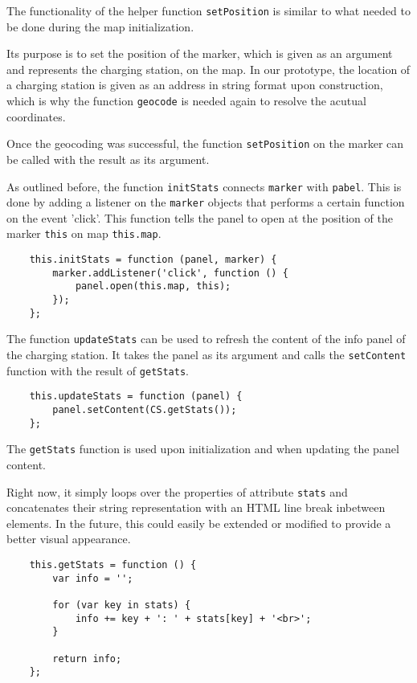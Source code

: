 The functionality of the helper function \texttt{setPosition} is similar to what needed to be done during the map initialization.

Its purpose is to set the position of the marker, which is given as an argument and represents the charging station, on the map. In our prototype, the location of a charging station is given as an address in string format upon construction, which is why the function \texttt{geocode} is needed again to resolve the acutual coordinates.

Once the geocoding was successful, the function \texttt{setPosition} on the marker can be called with the result as its argument.

As outlined before, the function \texttt{initStats} connects \texttt{marker} with \texttt{pabel}. This is done by adding a listener on the \texttt{marker} objects that performs a certain function on the event 'click'. This function tells the panel to open at the position of the marker \texttt{this} on map \texttt{this.map}.

\begin{verbatim}
    this.initStats = function (panel, marker) {
        marker.addListener('click', function () {
            panel.open(this.map, this);
        });
    };
\end{verbatim}

The function \texttt{updateStats} can be used to refresh the content of the info panel of the charging station. It takes the panel as its argument and calls the \texttt{setContent} function with the result of \texttt{getStats}.

\begin{verbatim}
    this.updateStats = function (panel) {
        panel.setContent(CS.getStats());
    };
\end{verbatim}

The \texttt{getStats} function is used upon initialization and when updating the panel content.

Right now, it simply loops over the properties of attribute \texttt{stats} and concatenates their string representation with an HTML line break inbetween elements. In the future, this could easily be extended or modified to provide a better visual appearance.

\begin{verbatim}
    this.getStats = function () {
        var info = '';

        for (var key in stats) {
            info += key + ': ' + stats[key] + '<br>';
        }

        return info;
    };
\end{verbatim}

